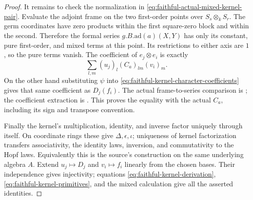\begin{proof}
It remains to check the normalization in
\eqref{eq:faithful-actual-mixed-kernel-pair}.
Evaluate the adjoint frame on the two first-order points over
\(S_s\otimes_kS_r\).
The germ coordinates have zero products within the first
square-zero block and within the second.  Therefore the formal
series \(g.B.\mathrm{ad}(a)(X,Y)\) has only its constant, pure
first-order, and mixed terms at this point.  Its restrictions
to either axis are \(1\), so the pure terms vanish.
The coefficient of \(e_j\otimes e_i\) is exactly
\[
                    \sum_{l,m}(u_j)_l(C_a)_{lm}(v_i)_m.
\]
On the other hand substituting \(\psi\) into
\eqref{eq:faithful-kernel-character-coefficients} gives that same
coefficient as \(D_j(f_i)\).
The actual frame-to-series comparison is
; the coefficient extraction is
.  This proves the equality with
the actual \(C_a\), including its sign and transpose convention.

Finally the kernel's multiplication, identity, and inverse factor
uniquely through itself.  On coordinate rings these give
\(\Delta,\epsilon,\iota\); uniqueness of kernel factorization
transfers associativity, the identity laws, inversion, and
commutativity to the Hopf laws.  Equivalently this is the
source's  construction on the same underlying
algebra \(A\).  Extend \(u_j\mapsto D_j\) and \(v_i\mapsto f_i\)
linearly from the chosen bases.  Their independence gives
injectivity; equations \eqref{eq:faithful-kernel-derivation},
\eqref{eq:faithful-kernel-primitives}, and the mixed calculation
give all the asserted identities.
\end{proof}

